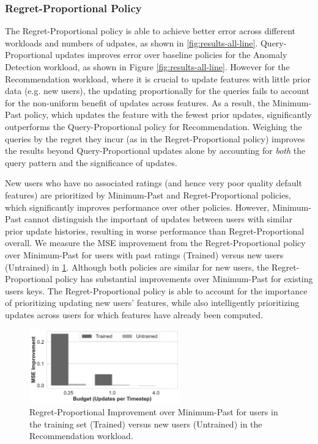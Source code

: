 \subsubsection{Regret-Proportional Policy}
The Regret-Proportional policy is able to achieve better error across different workloads and numbers of udpates, as shown in \cref{fig:results-all-line}. Query-Proportional updates improves error over baseline policies for the Anomaly Detection workload, as shown in Figure \cref{fig:results-all-line}. However for the Recommendation workload, where it is crucial to update features with little prior data (e.g. new users), the updating proportionally for the queries fails to account for the non-uniform benefit of updates across features. As a result, the Minimum-Past policy, which updates the feature with the fewest prior updates, significantly outperforms the Query-Proportional policy for Recommendation. Weighing the queries by the regret they incur (as in the Regret-Proportional policy) improves the results beyond Query-Proportional updates alone by accounting for \textit{both} the query pattern and the significance of updates. 

New users who have no associated ratings (and hence very poor quality default features) are prioritized by Minimum-Past and Regret-Proportional policies, which significantly improves performance over other policies. However, Minimum-Past cannot distinguish the important of updates between users with similar prior update histories, resulting in worse performance than Regret-Proportional overall. We measure the MSE improvement from the Regret-Proportional policy over Minimum-Past for users with past ratings (Trained) versus new users (Untrained) in \cref{f:user_variance}. Although both policies are similar for new users, the Regret-Proportional policy has substantial improvements over Minimum-Past for existing users keys. The Regret-Proportional policy is able to account for the importance of prioritizing updating new users' features, while also intelligently prioritizing updates across users for which features have already been computed. 


\begin{figure}[t]
\begin{center}
\includegraphics[width=6.5cm]{ralf/figures/user.pdf}
\centering
\end{center}
\caption{Regret-Proportional Improvement over Minimum-Past for users in the training set (Trained) versus new users (Untrained) in the Recommendation workload. }
\label{f:user_variance}
\end{figure}


